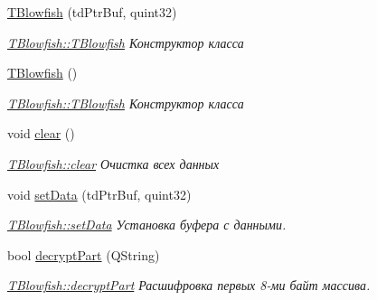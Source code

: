 \begin{DoxyCompactItemize}
\item 
\hyperlink{classunit_test_1_1_t_blowfish_a349e59d7c45d5675376b89def7500c16}{T\+Blowfish} (td\+Ptr\+Buf, quint32)
\begin{DoxyCompactList}\small\item\em \hyperlink{classunit_test_1_1_t_blowfish_a349e59d7c45d5675376b89def7500c16}{T\+Blowfish\+::\+T\+Blowfish} Конструктор класса \end{DoxyCompactList}\item 
\mbox{\label{classunit_test_1_1_t_blowfish_ad9ca35f3391415f31a265c440d63bf7f}} 
\hyperlink{classunit_test_1_1_t_blowfish_ad9ca35f3391415f31a265c440d63bf7f}{T\+Blowfish} ()
\begin{DoxyCompactList}\small\item\em \hyperlink{classunit_test_1_1_t_blowfish_a349e59d7c45d5675376b89def7500c16}{T\+Blowfish\+::\+T\+Blowfish} Конструктор класса \end{DoxyCompactList}\item 
\mbox{\label{classunit_test_1_1_t_blowfish_a2e410b2e410752f3ba96296fbcce9df2}} 
void \hyperlink{classunit_test_1_1_t_blowfish_a2e410b2e410752f3ba96296fbcce9df2}{clear} ()
\begin{DoxyCompactList}\small\item\em \hyperlink{classunit_test_1_1_t_blowfish_a2e410b2e410752f3ba96296fbcce9df2}{T\+Blowfish\+::clear} Очистка всех данных \end{DoxyCompactList}\item 
void \hyperlink{classunit_test_1_1_t_blowfish_aac58cd909cef267ba409859c279dc521}{set\+Data} (td\+Ptr\+Buf, quint32)
\begin{DoxyCompactList}\small\item\em \hyperlink{classunit_test_1_1_t_blowfish_aac58cd909cef267ba409859c279dc521}{T\+Blowfish\+::set\+Data} Установка буфера с данными. \end{DoxyCompactList}\item 
bool \hyperlink{classunit_test_1_1_t_blowfish_a5bb77f2618aa5dd97b86d842e546fdae}{decrypt\+Part} (Q\+String)
\begin{DoxyCompactList}\small\item\em \hyperlink{classunit_test_1_1_t_blowfish_a5bb77f2618aa5dd97b86d842e546fdae}{T\+Blowfish\+::decrypt\+Part} Расшифровка первых 8-\/ми байт массива. \end{DoxyCompactList}\item 

\end{DoxyCompactItemize}
